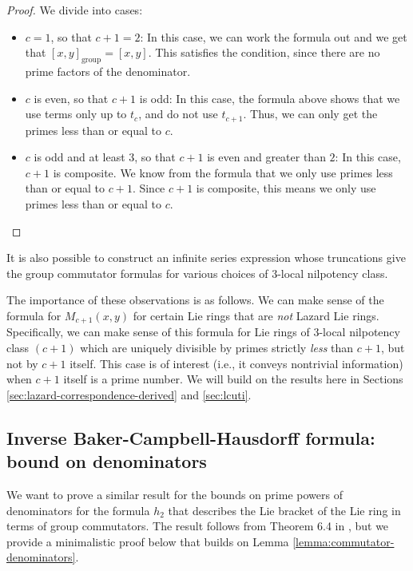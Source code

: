 \documentclass{ucetd}
\begin{document}
\begin{proof}
  We divide into cases:

  \begin{itemize}
  \item $c = 1$, so that $c + 1 = 2$: In this case, we can work the
    formula out and we get that $[x,y]_{\text{group}} = [x,y]$. This
    satisfies the condition, since there are no prime factors of the
    denominator.
  \item $c$ is even, so that $c + 1$ is odd: In this case, the
    formula above shows that we use terms only up to $t_c$, and do not
    use $t_{c+1}$. Thus, we can only get the primes less than or equal
    to $c$.
  \item $c$ is odd and at least $3$, so that $c + 1$ is even and
    greater than $2$: In this case, $c + 1$ is composite. We know from the
    formula that we only use primes less than or equal to $c + 1$. Since
    $c + 1$ is composite, this means we only use primes less than or equal
    to $c$.
  \end{itemize}
\end{proof}

It is also possible to construct an infinite series expression whose
truncations give the group commutator formulas for various choices of
$3$-local nilpotency class.

The importance of these observations is as follows. We can make sense
of the formula for $M_{c+1}(x,y)$ for certain Lie rings that are {\em
  not} Lazard Lie rings. Specifically, we can make sense of this
formula for Lie rings of $3$-local nilpotency class $(c + 1)$ which
are uniquely divisible by primes strictly {\em less} than $c + 1$, but
not by $c + 1$ itself. This case is of interest (i.e., it conveys
nontrivial information) when $c + 1$ itself is a prime number. We will
build on the results here in Sections
\ref{sec:lazard-correspondence-derived} and \ref{sec:lcuti}.

\subsection{Inverse Baker-Campbell-Hausdorff formula: bound on denominators}

We want to prove a similar result for the bounds on prime powers of
denominators for the formula $h_2$ that describes the Lie bracket of
the Lie ring in terms of group commutators. The result follows from
Theorem 6.4 in \cite{Lazardeffective}, but we provide a minimalistic
proof below that builds on Lemma \ref{lemma:commutator-denominators}.
\end{document}
